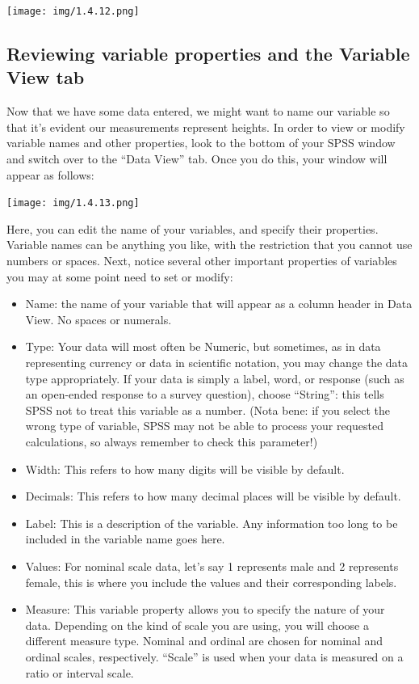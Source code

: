 \documentclass[
]{book}
\providecommand{\tightlist}{%
  \setlength{\itemsep}{0pt}\setlength{\parskip}{0pt}}
\begin{document}
\texttt{[image: img/1.4.12.png]}

\hypertarget{reviewing-variable-properties-and-the-variable-view-tab-1}{%
\subsection{Reviewing variable properties and the Variable View tab}\label{reviewing-variable-properties-and-the-variable-view-tab-1}}

Now that we have some data entered, we might want to name our variable so that it's evident our measurements represent heights. In order to view or modify variable names and other properties, look to the bottom of your SPSS window and switch over to the ``Data View'' tab. Once you do this, your window will appear as follows:

\texttt{[image: img/1.4.13.png]}

Here, you can edit the name of your variables, and specify their properties. Variable names can be anything you like, with the restriction that you cannot use numbers or spaces. Next, notice several other important properties of variables you may at some point need to set or modify:

\begin{itemize}
\tightlist
\item
  Name: the name of your variable that will appear as a column header in Data View. No spaces or numerals.
\item
  Type: Your data will most often be Numeric, but sometimes, as in data representing currency or data in scientific notation, you may change the data type appropriately. If your data is simply a label, word, or response (such as an open-ended response to a survey question), choose ``String'': this tells SPSS not to treat this variable as a number. (Nota bene: if you select the wrong type of variable, SPSS may not be able to process your requested calculations, so always remember to check this parameter!)
\item
  Width: This refers to how many digits will be visible by default.
\item
  Decimals: This refers to how many decimal places will be visible by default.
\item
  Label: This is a description of the variable. Any information too long to be included in the variable name goes here.
\item
  Values: For nominal scale data, let's say 1 represents male and 2 represents female, this is where you include the values and their corresponding labels.
\item
  Measure: This variable property allows you to specify the nature of your data. Depending on the kind of scale you are using, you will choose a different measure type. Nominal and ordinal are chosen for nominal and ordinal scales, respectively. ``Scale'' is used when your data is measured on a ratio or interval scale.
\end{itemize}
\end{document}
